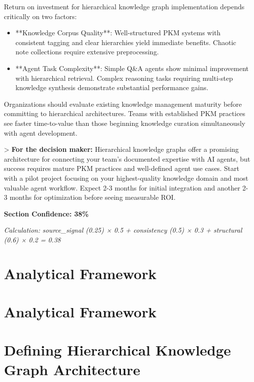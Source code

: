 \documentclass[a4paper,11pt]{article}
\begin{document}
Return on investment for hierarchical knowledge graph implementation depends critically on two factors:


\begin{itemize}
  \item **Knowledge Corpus Quality**: Well-structured PKM systems with consistent tagging and clear hierarchies yield immediate benefits. Chaotic note collections require extensive preprocessing.
\end{itemize}

\begin{itemize}
  \item **Agent Task Complexity**: Simple Q\&A agents show minimal improvement with hierarchical retrieval. Complex reasoning tasks requiring multi-step knowledge synthesis demonstrate substantial performance gains.
\end{itemize}

Organizations should evaluate existing knowledge management maturity before committing to hierarchical architectures. Teams with established PKM practices see faster time-to-value than those beginning knowledge curation simultaneously with agent development.


> \textbf{For the decision maker:} Hierarchical knowledge graphs offer a promising architecture for connecting your team's documented expertise with AI agents, but success requires mature PKM practices and well-defined agent use cases. Start with a pilot project focusing on your highest-quality knowledge domain and most valuable agent workflow. Expect 2-3 months for initial integration and another 2-3 months for optimization before seeing measurable ROI.


\textbf{Section Confidence: 38\%}\par
\textit{Calculation: source\_signal (0.25) × 0.5 + consistency (0.5) × 0.3 + structural (0.6) × 0.2 = 0.38}

\clearpage
\section{Analytical Framework}

\section{Analytical Framework}

\section{Defining Hierarchical Knowledge Graph Architecture}
\end{document}

